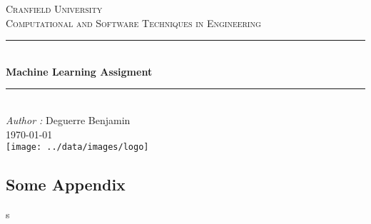 \documentclass[a4paper, 11pt]{article}
\newcommand{\HRule}{\rule{\linewidth}{0.5mm}} %
\begin{document}
	\begin{titlepage}


		\center %

    \vspace*{4cm}
		\textsc{\LARGE Cranfield University}\\[1.5cm] %
		\textsc{\Large Computational and Software Techniques in Engineering}\\[0.5cm]
    \HRule \\[0.4cm]
		{ \huge \bfseries Machine Learning Assigment}\\[0.4cm] %
		\HRule \\[1.5cm]

    {\large \emph{Author :} Deguerre Benjamin}\\[1cm]
		{\large \today}\\[1cm] %

    \vfill %
		\texttt{[image: ../data/images/logo]}\\[1cm] %




	\end{titlepage}

\setcounter{page}{1}
\tableofcontents




\newpage


\newpage


\newpage


\newpage


\newpage


\newpage


\newpage


\newpage

\begin{appendices}
\section{Some Appendix}
\end{appendices}s
\end{document}
